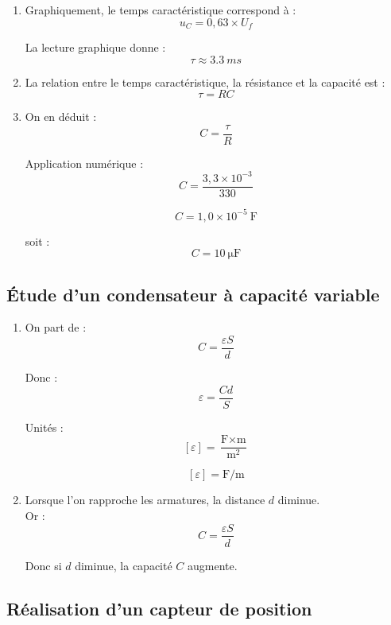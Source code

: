 \documentclass[a4paper,11pt,fleqn]{scrartcl}
\begin{document}
\begin{enumerate}[resume]
    \item Graphiquement, le temps caractéristique correspond à :
    \[
    u_C = 0,63\times U_f
    \]

    La lecture graphique donne :
    \[
    \tau \approx \SI{3,3}{ms}
    \]

    \item La relation entre le temps caractéristique, la résistance et la capacité est :
    \[
    \tau = RC
    \]

    \item On en déduit :
    \[
    C=\dfrac{\tau}{R}
    \]

    Application numérique :
    \[
    C=\dfrac{3,3\times10^{-3}}{330}
    \]

    \[
    C=1,0\times10^{-5}\ \si{\farad}
    \]

    soit :
    \[
    C=\SI{10}{\micro\farad}
    \]
\end{enumerate}

\subsection{Étude d'un condensateur à capacité variable}

\begin{enumerate}[resume]
    \item On part de :
    \[
    C=\dfrac{\varepsilon S}{d}
    \]

    Donc :
    \[
    \varepsilon = \dfrac{Cd}{S}
    \]

    Unités :
    \[
    [\varepsilon]=\dfrac{\si{\farad}\times\si{\meter}}{\si{\meter\squared}}
    \]

    \[
    [\varepsilon]=\si{\farad\per\meter}
    \]

    \item Lorsque l'on rapproche les armatures, la distance $d$ diminue.\\

    Or :
    \[
    C=\dfrac{\varepsilon S}{d}
    \]

    Donc si $d$ diminue, la capacité $C$ augmente.
\end{enumerate}

\subsection{Réalisation d'un capteur de position}
\end{document}
